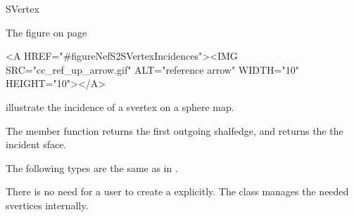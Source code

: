 
\ccRefPageBegin



\begin{ccRefClass}{SVertex}

\ccDefinition
 
The figure on page
\pageref{figureNefS2SVertexIncidences}
\begin{ccHtmlOnly}
  <A HREF="#figureNefS2SVertexIncidences"><IMG 
  SRC="cc_ref_up_arrow.gif" ALT="reference arrow" WIDTH="10" HEIGHT="10"></A>
\end{ccHtmlOnly} illustrate the incidence of a svertex on a sphere map. 

The member function 
 returns the first outgoing shalfedge, and 
returns the the incident sface.


\ccTypes
{}
\ccThreeToTwo

The following types are the same as in .



\ccGlue
{}
\ccGlue
{}

\ccCreation
{}

There is no need for a user to create a  explicitly. The
class  manages the needed svertices internally.

\ccOperations



\end{ccRefClass}
